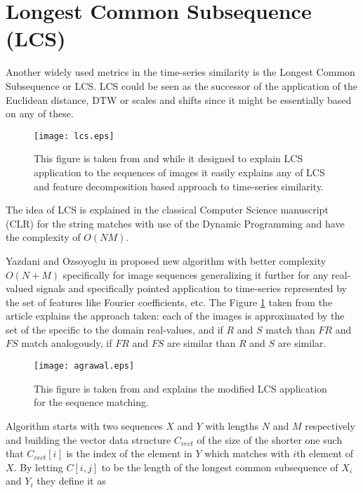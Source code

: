 \section{Longest Common Subsequence (LCS) } \label{lcs}
Another widely used metrics in the time-series similarity is the Longest Common Subsequence or LCS. LCS could be seen as the successor of the application of the Euclidean distance, DTW or scales and shifts \cite{citeulike:3816327} since it might be essentially based on any of these. 
\begin{figure}[tbp]
   \centering
   \texttt{[image: lcs.eps]}
   \caption{This figure is taken from \cite{citeulike:4367061} and while it designed to explain LCS application to the sequences of images it easily explains any of LCS and feature decomposition based approach to time-series similarity.}
   \label{fig:lcs}
\end{figure} 
The idea of LCS is explained in the classical Computer Science manuscript \cite{citeulike:180287} (CLR) for the string matches with use of the Dynamic Programming and have the complexity of $O(NM)$. 

Yazdani and Ozsoyoglu in \cite{citeulike:4367061} proposed new algorithm with better complexity $O(N+M)$ specifically for image sequences generalizing it further for any real-valued signals and specifically pointed application to time-series represented by the set of features like Fourier coefficients, etc. The Figure \ref{fig:lcs} taken from the article explains the approach taken: each of the images is approximated by the set of the specific to the domain real-values, and if $R$ and $S$ match than $FR$ and $FS$ match analogously, if $FR$ and $FS$ are similar than $R$ and $S$ are similar.

\begin{figure}[bp]
   \centering
   \texttt{[image: agrawal.eps]}
   \caption{This figure is taken from \cite{citeulike:3816327} and explains the modified LCS application for the sequence matching.}
   \label{fig:agrawal_lcs}
\end{figure} 

Algorithm starts with two sequences $X$ and $Y$ with lengths $N$ and $M$ respectively and building the vector data structure $C_{vect}$ of the size of the shorter one such that $C_{vect}[i]$ is the index of the element in $Y$ which matches with $i$th element of $X$. By letting $C[i,j]$ to be the length of the longest common subsequence of $X_{i}$ and $Y_{i}$ they define it as 

